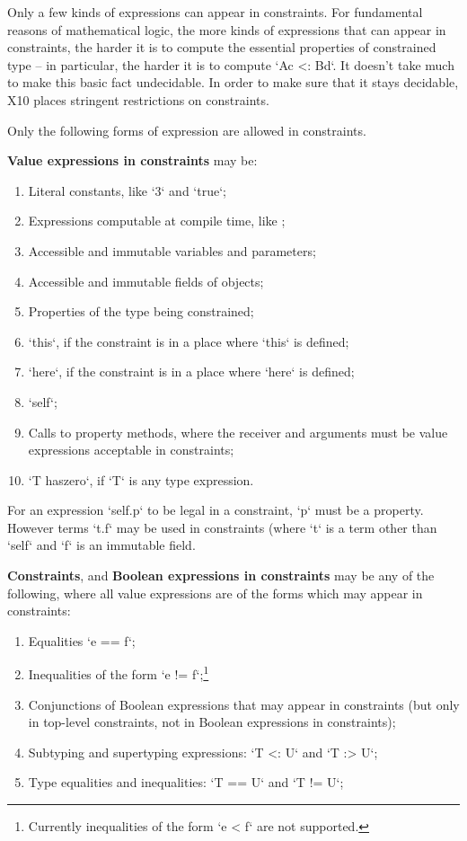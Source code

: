Only a few kinds of expressions can appear in constraints.  For fundamental
reasons of mathematical logic, the more kinds of expressions that can appear
in constraints, the harder it is to compute the essential properties of
constrained type -- in particular, the harder it is to compute 
\xcd`A{c} <: B{d}`.  It doesn't take much to make this basic fact undecidable.
In order to make sure that it stays decidable, X10 places stringent restrictions on
constraints.  

Only the following forms of expression are allowed in constraints.  

{\bf Value expressions in constraints} may be: 
\begin{enumerate}
\item Literal constants, like \xcd`3` and \xcd`true`;
\item Expressions computable at compile time, like ;
\item Accessible and immutable variables and parameters;
\item Accessible and immutable fields of objects;
\item Properties of the type being constrained;
\item \xcd`this`, if the constraint is in a place where \xcd`this` is defined;
\item \xcd`here`, if the constraint is in a place where \xcd`here` is defined;
\item \xcd`self`;
\item Calls to property methods, where the receiver and arguments must be
      value expressions acceptable in constraints;
\item \xcd`T haszero`, if \xcd`T` is any type expression.
\end{enumerate}
For an expression \xcd`self.p` to be legal in a constraint, 
\xcd`p` must be 
a property. However terms \xcd`t.f` may be
used in constraints (where \xcd`t` is a term other than \xcd`self` and
\xcd`f` is an immutable field.

{\bf Constraints}, and {\bf Boolean expressions in constraints}  may be any of
the following, where 
all value expressions are of the forms which may appear in constraints: 
\begin{enumerate}
\item Equalities \xcd`e == f`;
\item Inequalities of the form \xcd`e != f`;\footnote{Currently inequalities
      of the form \xcd`e < f` are not supported.}
\item Conjunctions of Boolean expressions that may appear in constraints (but
      only in top-level constraints, not in Boolean expressions in constraints);
\item Subtyping and supertyping expressions: \xcd`T <: U` and \xcd`T :> U`; 
\item Type equalities and inequalities: \xcd`T == U` and \xcd`T != U`; 
\end{enumerate}

